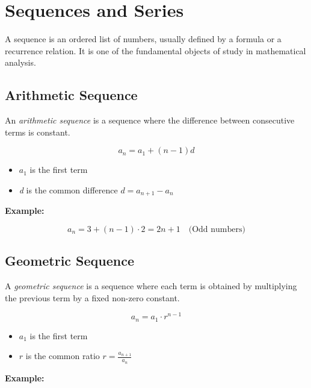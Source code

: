 \newpage
\section{Sequences and Series}

A sequence is an ordered list of numbers, usually defined by a formula or a recurrence relation. It is 
one of the fundamental objects of study in mathematical analysis.

\subsection{Arithmetic Sequence}

An \emph{arithmetic sequence} is a sequence where the difference between consecutive terms is constant.

\[
    a_n = a_1 + (n - 1)d
\]

\begin{itemize}

    \item \(a_1\) is the first term

    \item \emph{d} is the common difference \(d = a_{n + 1} - a_{n}\)

\end{itemize}

\textbf{Example:}
\vspace{\baselineskip}

\[
    a_n = 3 + (n - 1) \cdot 2 = 2n + 1 \quad \text{(Odd numbers)}
\]

\subsection{Geometric Sequence}

A \emph{geometric sequence} is a sequence where each term is obtained by multiplying the previous term 
by a fixed non-zero constant.

\[
    a_n = a_1 \cdot r^{n-1}
\]

\begin{itemize}

    \item \(a_1\) is the first term

    \item \(r\) is the common ratio \(r = \frac{a_{n + 1}}{a_n}\)

\end{itemize}

\textbf{Example:}
\vspace{\baselineskip}

